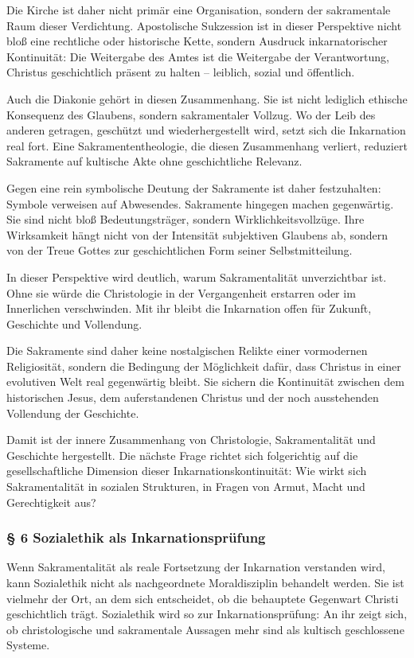 \documentclass[
  ngerman,
]{article}
\begin{document}
Die Kirche ist daher nicht primär eine Organisation, sondern der
sakramentale Raum dieser Verdichtung. Apostolische Sukzession ist in
dieser Perspektive nicht bloß eine rechtliche oder historische Kette,
sondern Ausdruck inkarnatorischer Kontinuität: Die Weitergabe des Amtes
ist die Weitergabe der Verantwortung, Christus geschichtlich präsent zu
halten -- leiblich, sozial und öffentlich.

Auch die Diakonie gehört in diesen Zusammenhang. Sie ist nicht lediglich
ethische Konsequenz des Glaubens, sondern sakramentaler Vollzug. Wo der
Leib des anderen getragen, geschützt und wiederhergestellt wird, setzt
sich die Inkarnation real fort. Eine Sakramententheologie, die diesen
Zusammenhang verliert, reduziert Sakramente auf kultische Akte ohne
geschichtliche Relevanz.

Gegen eine rein symbolische Deutung der Sakramente ist daher
festzuhalten: Symbole verweisen auf Abwesendes. Sakramente hingegen
machen gegenwärtig. Sie sind nicht bloß Bedeutungsträger, sondern
Wirklichkeitsvollzüge. Ihre Wirksamkeit hängt nicht von der Intensität
subjektiven Glaubens ab, sondern von der Treue Gottes zur
geschichtlichen Form seiner Selbstmitteilung.

In dieser Perspektive wird deutlich, warum Sakramentalität unverzichtbar
ist. Ohne sie würde die Christologie in der Vergangenheit erstarren oder
im Innerlichen verschwinden. Mit ihr bleibt die Inkarnation offen für
Zukunft, Geschichte und Vollendung.

Die Sakramente sind daher keine nostalgischen Relikte einer vormodernen
Religiosität, sondern die Bedingung der Möglichkeit dafür, dass Christus
in einer evolutiven Welt real gegenwärtig bleibt. Sie sichern die
Kontinuität zwischen dem historischen Jesus, dem auferstandenen Christus
und der noch ausstehenden Vollendung der Geschichte.

Damit ist der innere Zusammenhang von Christologie, Sakramentalität und
Geschichte hergestellt. Die nächste Frage richtet sich folgerichtig auf
die gesellschaftliche Dimension dieser Inkarnationskontinuität: Wie
wirkt sich Sakramentalität in sozialen Strukturen, in Fragen von Armut,
Macht und Gerechtigkeit aus?

\subsubsection{§ 6 Sozialethik als
Inkarnationsprüfung}\label{sozialethik-als-inkarnationspruxfcfung}

Wenn Sakramentalität als reale Fortsetzung der Inkarnation verstanden
wird, kann Sozialethik nicht als nachgeordnete Moraldisziplin behandelt
werden. Sie ist vielmehr der Ort, an dem sich entscheidet, ob die
behauptete Gegenwart Christi geschichtlich trägt. Sozialethik wird so
zur Inkarnationsprüfung: An ihr zeigt sich, ob christologische und
sakramentale Aussagen mehr sind als kultisch geschlossene Systeme.
\end{document}
